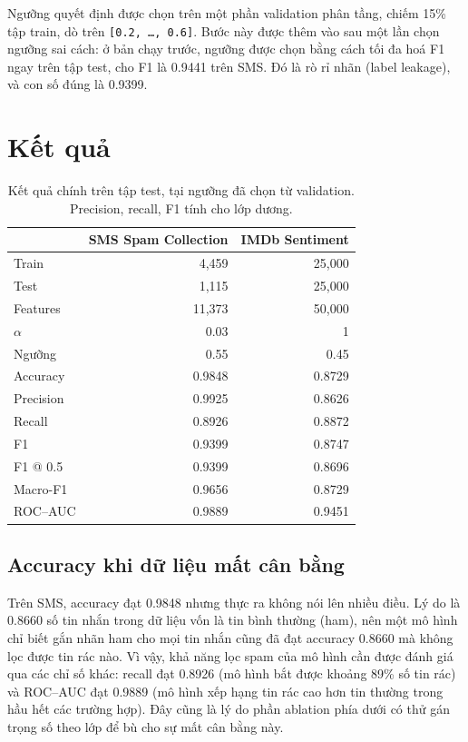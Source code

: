 \documentclass[11pt,a4paper]{article}
\newcommand{\code}[1]{\texttt{#1}}
\begin{document}
Ngưỡng quyết định được chọn trên một phần validation phân tầng, chiếm 15\% tập train, dò trên \code{[0.2, \dots, 0.6]}. Bước này được thêm vào sau một lần chọn ngưỡng sai cách: ở bản chạy trước, ngưỡng được chọn bằng cách tối đa hoá F1 ngay trên tập test, cho F1 là 0.9441 trên SMS. Đó là rò rỉ nhãn (label leakage), và con số đúng là 0.9399. 

\section{Kết quả}\label{sec:results}

\begin{table}[H]
\centering
\caption{Kết quả chính trên tập test, tại ngưỡng đã chọn từ validation. Precision, recall, F1 tính cho lớp dương.}
\label{tab:main}
\setlength{\tabcolsep}{10pt}
\begin{tabular}{lrr}
\toprule
 & \textbf{SMS Spam Collection} & \textbf{IMDb Sentiment} \\
\midrule
Train & 4,459 & 25,000 \\
Test & 1,115 & 25,000 \\
Features & 11,373 & 50,000 \\
$\alpha$ & 0.03 & 1 \\
Ngưỡng & 0.55 & 0.45 \\
\midrule
Accuracy & 0.9848 & 0.8729 \\
Precision & 0.9925 & 0.8626 \\
Recall & 0.8926 & 0.8872 \\
F1 & 0.9399 & 0.8747 \\
F1 @ 0.5 & 0.9399 & 0.8696 \\
Macro-F1 & 0.9656 & 0.8729 \\
ROC--AUC & 0.9889 & 0.9451 \\
\bottomrule
\end{tabular}
\end{table}

\subsection{Accuracy khi dữ liệu mất cân bằng}

Trên SMS, accuracy đạt 0.9848 nhưng thực ra không nói lên nhiều điều. Lý do là 0.8660 số tin nhắn trong dữ liệu vốn là tin bình thường (ham), nên một mô hình chỉ biết gắn nhãn ham cho mọi tin nhắn cũng đã đạt accuracy 0.8660 mà không lọc được tin rác nào. Vì vậy, khả năng lọc spam của mô hình cần được đánh giá qua các chỉ số khác: recall đạt 0.8926 (mô hình bắt được khoảng 89\% số tin rác) và ROC--AUC đạt 0.9889 (mô hình xếp hạng tin rác cao hơn tin thường trong hầu hết các trường hợp). Đây cũng là lý do phần ablation phía dưới có thử gán trọng số theo lớp để bù cho sự mất cân bằng này.
\end{document}
